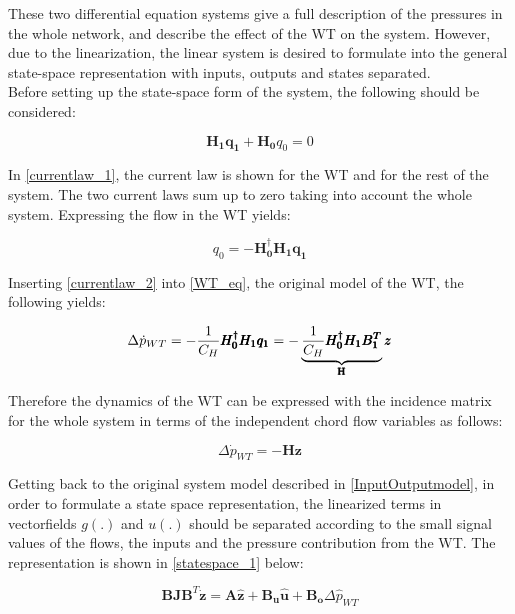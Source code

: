 These two differential equation systems give a full description of the pressures in the whole network, and  describe the effect of the WT on the system. However, due to the linearization, the linear system is desired to formulate into the general state-space representation with inputs, outputs and states separated. 
\\
Before setting up the state-space form of the system, the following should be considered: 

\begin{equation}
 \pmb{H_1}\pmb{q_1} + \pmb{H_0}q_0 = 0 
 \label{currentlaw_1}
\end{equation}

In \eqref{currentlaw_1}, the current law is shown for the WT and for the rest of the system. The two current laws sum up to zero taking into account the whole system. Expressing the flow in the WT yields:

\begin{equation}
q_0 = -\pmb{H^{\dagger}_0}\pmb{H_1}\pmb{q_1}
 \label{currentlaw_2}
\end{equation}

Inserting \eqref{currentlaw_2} into \eqref{WT_eq}, the original model of the WT, the following yields:

\begin{equation}
\Delta \dot{p}_{WT} = - \frac{1}{C_H} \pmb{H^{\dagger}_0}\pmb{H_1}\pmb{q_1} = - \underbrace{\frac{1}{C_H} \pmb{H^{\dagger}_0}\pmb{H_1}\pmb{{B_1^{T}}}}_\text{\pmb{H}} \pmb{z}
 \label{currentlaw_3}
\end{equation}

Therefore the dynamics of the WT can be expressed with the incidence matrix for the whole system in terms of the independent chord flow variables as follows: 

\begin{equation}
\Delta \dot{p}_{WT} = - \pmb{H} \pmb{z}
 \label{currentlaw_4}
\end{equation}

Getting back to the original system model described in \eqref{InputOutputmodel}, in order to formulate a state space representation, the linearized terms in  vectorfields $g(.)$ and $u(.)$ should be separated according to the small signal values of the flows, the inputs and the pressure contribution from the WT. The representation is shown in \eqref{statespace_1} below: 

\begin{equation}
 \pmb{B}\pmb{J {B}}^T \pmb{\dot{z}} = \pmb{A} \pmb{\hat{z}} + \pmb{B_u} \pmb{\hat{u}} + \pmb{B_o} \Delta \hat{p}_{WT}    
 \label{statespace_1}
\end{equation}

